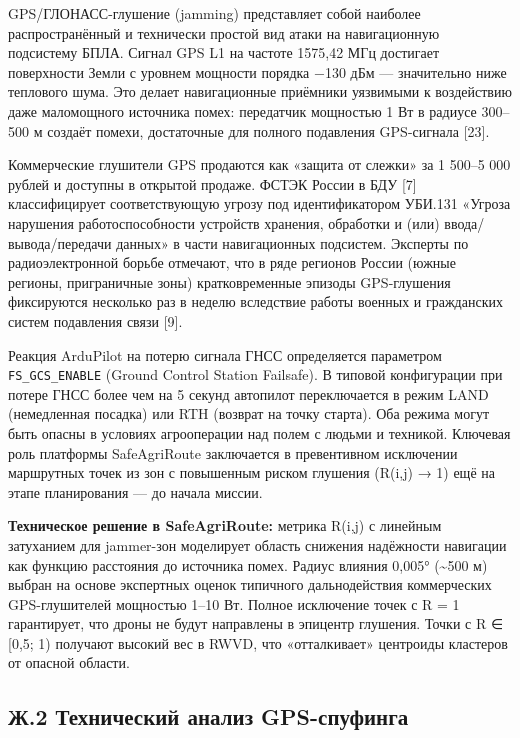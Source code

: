 \documentclass[14pt,a4paper]{extarticle}
\begin{document}
GPS/ГЛОНАСС-глушение (jamming) представляет собой наиболее распространённый и технически простой вид атаки на навигационную подсистему БПЛА. Сигнал GPS L1 на частоте 1575,42 МГц достигает поверхности Земли с уровнем мощности порядка −130 дБм --- значительно ниже теплового шума. Это делает навигационные приёмники уязвимыми к воздействию даже маломощного источника помех: передатчик мощностью 1 Вт в радиусе 300--500 м создаёт помехи, достаточные для полного подавления GPS-сигнала {[}23{]}.

Коммерческие глушители GPS продаются как «защита от слежки» за 1 500--5 000 рублей и доступны в открытой продаже. ФСТЭК России в БДУ {[}7{]} классифицирует соответствующую угрозу под идентификатором УБИ.131 «Угроза нарушения работоспособности устройств хранения, обработки и (или) ввода/вывода/передачи данных» в части навигационных подсистем. Эксперты по радиоэлектронной борьбе отмечают, что в ряде регионов России (южные регионы, приграничные зоны) кратковременные эпизоды GPS-глушения фиксируются несколько раз в неделю вследствие работы военных и гражданских систем подавления связи {[}9{]}.

Реакция ArduPilot на потерю сигнала ГНСС определяется параметром \texttt{FS\_GCS\_ENABLE} (Ground Control Station Failsafe). В типовой конфигурации при потере ГНСС более чем на 5 секунд автопилот переключается в режим LAND (немедленная посадка) или RTH (возврат на точку старта). Оба режима могут быть опасны в условиях агрооперации над полем с людьми и техникой. Ключевая роль платформы SafeAgriRoute заключается в превентивном исключении маршрутных точек из зон с повышенным риском глушения (R(i,j) → 1) ещё на этапе планирования --- до начала миссии.

\textbf{Техническое решение в SafeAgriRoute:} метрика R(i,j) с линейным затуханием для jammer-зон моделирует область снижения надёжности навигации как функцию расстояния до источника помех. Радиус влияния 0,005° (\textasciitilde500 м) выбран на основе экспертных оценок типичного дальнодействия коммерческих GPS-глушителей мощностью 1--10 Вт. Полное исключение точек с R = 1 гарантирует, что дроны не будут направлены в эпицентр глушения. Точки с R ∈ {[}0,5; 1) получают высокий вес в RWVD, что «отталкивает» центроиды кластеров от опасной области.

\hypertarget{ux436.2-ux442ux435ux445ux43dux438ux447ux435ux441ux43aux438ux439-ux430ux43dux430ux43bux438ux437-gps-ux441ux43fux443ux444ux438ux43dux433ux430}{%
\subsection{Ж.2 Технический анализ GPS-спуфинга}\label{ux436.2-ux442ux435ux445ux43dux438ux447ux435ux441ux43aux438ux439-ux430ux43dux430ux43bux438ux437-gps-ux441ux43fux443ux444ux438ux43dux433ux430}}
\end{document}
